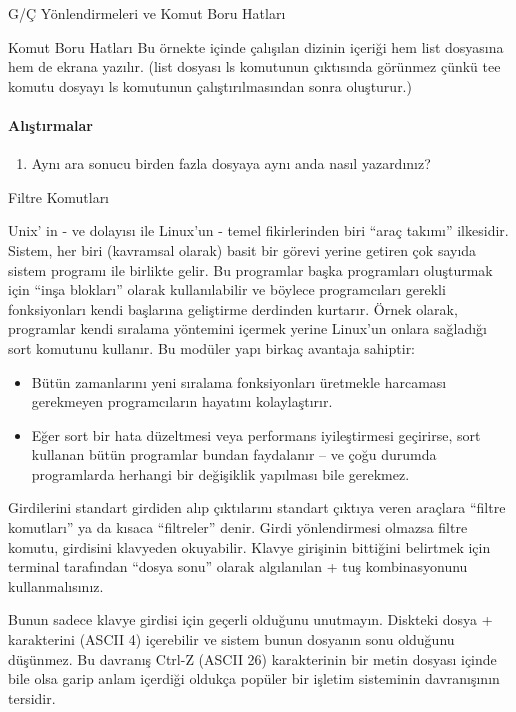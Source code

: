 \begin{section}{G/Ç Yönlendirmeleri ve Komut Boru Hatları}
\begin{subsection}{Komut Boru Hatları}
Bu örnekte içinde çalışılan dizinin içeriği hem list dosyasına hem de ekrana yazılır. (list dosyası ls komutunun çıktısında görünmez çünkü tee komutu dosyayı ls komutunun çalıştırılmasından sonra oluşturur.)

\paragraph{{\Huge{\PencilLeftDown}}Alıştırmalar}{
\begin{enumerate}
 \item Aynı ara sonucu birden fazla dosyaya aynı anda nasıl yazardınız?
\end{enumerate}}
\end{subsection}
\end{section}
\begin{section}{Filtre Komutları}

Unix' in - ve dolayısı ile Linux'un - temel fikirlerinden biri ``araç takımı'' ilkesidir. Sistem, her biri (kavramsal olarak) basit bir görevi yerine getiren çok sayıda sistem programı ile birlikte gelir. Bu programlar başka programları oluşturmak için “inşa blokları” olarak kullanılabilir ve böylece programcıları gerekli fonksiyonları kendi başlarına geliştirme derdinden kurtarır. Örnek olarak, programlar kendi sıralama yöntemini içermek yerine Linux'un onlara sağladığı sort komutunu kullanır. Bu modüler yapı birkaç avantaja sahiptir:

\begin{itemize}
\item Bütün zamanlarını yeni sıralama fonksiyonları üretmekle harcaması gerekmeyen programcıların hayatını kolaylaştırır.
\item Eğer sort bir hata düzeltmesi veya performans iyileştirmesi geçirirse, sort kullanan bütün programlar bundan faydalanır – ve çoğu durumda programlarda herhangi bir değişiklik yapılması bile gerekmez.
\end{itemize}

Girdilerini standart girdiden alıp çıktılarını standart çıktıya veren araçlara “filtre komutları” ya da kısaca “filtreler” denir. Girdi yönlendirmesi olmazsa filtre komutu, girdisini klavyeden okuyabilir. Klavye girişinin bittiğini belirtmek için terminal tarafından “dosya sonu” olarak algılanılan \Ctrl +  tuş kombinasyonunu kullanmalısınız.

Bunun sadece klavye girdisi için geçerli olduğunu unutmayın. Diskteki dosya \Ctrl +  karakterini (ASCII 4) içerebilir ve sistem bunun dosyanın sonu olduğunu düşünmez. Bu davranış Ctrl-Z (ASCII 26) karakterinin bir metin dosyası içinde bile olsa garip anlam içerdiği oldukça popüler bir işletim sisteminin davranışının tersidir.


\end{section}
